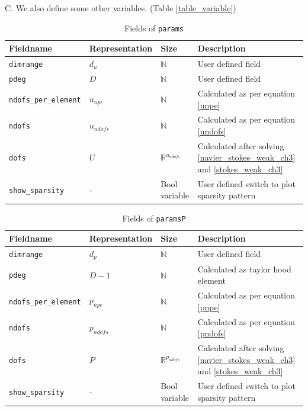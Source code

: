\documentclass[a4paper,twoside,openright]{book}
\begin{document}
C. We also define some other variables. (Table \ref{table_variable})\\

\begin{table}
\cprotect\caption{Fields of \verb|params|}
\label{table_params}
\begin{center}
\begin{tabular}{| p{}| p{} |  p{} | p{}|} 
\hline
\textbf{Fieldname} & \textbf{Representation} & \textbf{Size} & \textbf{Description}\\
\hline
\verb|dimrange| & $d_u$ & $\mathbb{N}$ & User defined field\\
\hline
\verb|pdeg| & $D$ & $\mathbb{N}$ & User defined field\\
\hline
\verb|ndofs_per_element| & $u_{npe}$ & $\mathbb{N}$ & Calculated as per equation \ref{unpe}\\
\hline
\verb|ndofs| & $u_{ndofs}$ & $\mathbb{N}$ & Calculated as per equation \ref{undofs}\\
\hline
\verb|dofs| & $U$ & $\mathbb{R}^{u_{ndofs}}$ & Calculated after solving \ref{navier_stokes_weak_ch3} and \ref{stokes_weak_ch3}\\
\hline
\verb|show_sparsity| & - & Bool variable & User defined switch to plot sparsity pattern\\
\hline
\end{tabular}
\end{center}
\end{table}

\begin{table}
\cprotect\caption{Fields of \verb|paramsP|}
\label{table_paramsP}
\begin{center}
\begin{tabular}{| p{}| p{} |  p{} | p{}|}
\hline
\textbf{Fieldname} & \textbf{Representation} & \textbf{Size} & \textbf{Description}\\
\hline
\verb|dimrange| & $d_p$ & $\mathbb{N}$ & User defined field\\
\hline
\verb|pdeg| & $D-1$ & $\mathbb{N}$ & Calculated as taylor hood element\\
\hline
\verb|ndofs_per_element| & $p_{npe}$ & $\mathbb{N}$ & Calculated as per equation \ref{pnpe}\\
\hline
\verb|ndofs| & $p_{ndofs}$ & $\mathbb{N}$ & Calculated as per equation \ref{pndofs}\\
\hline
\verb|dofs| & $P$ & $\mathbb{R}^{p_{ndofs}}$ & Calculated after solving \ref{navier_stokes_weak_ch3} and \ref{stokes_weak_ch3}\\
\hline
\verb|show_sparsity| & - & Bool variable & User defined switch to plot sparsity pattern\\
\hline
\end{tabular}
\end{center}
\end{table}
\end{document}
